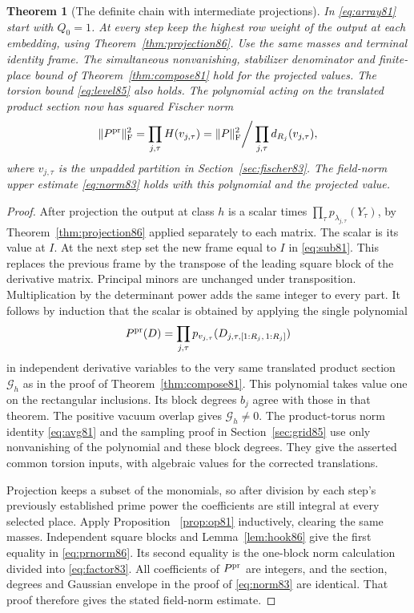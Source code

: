 \documentclass[a4paper,11pt]{article}
\newtheorem{theorem}[proposition]{Theorem}
\theoremstyle{definition}
\theoremstyle{remark}
\numberwithin{equation}{section}
\begin{document}
\begin{theorem}[The definite chain with intermediate projections]
\label{thm:projectchain86}
In \eqref{eq:array81} start with \(Q_0=1\). At every step keep
the highest row weight of the output at each embedding, using
Theorem~\ref{thm:projection86}. Use the same masses and terminal
identity frame. The simultaneous nonvanishing, stabilizer denominator
and finite-place bound of Theorem~\ref{thm:compose81} hold for the
projected values. The torsion bound \eqref{eq:level85} also holds.
The polynomial acting on the translated product section now has
squared Fischer norm
\begin{equation}
 \|P^{\rm pr}\|_{\rm F}^2=\prod_{j,\tau}H(v_{j,\tau})
   =\|P\|_{\rm F}^2\bigg/\prod_{j,\tau}d_{R_j}(v_{j,\tau}),
                                                        \label{eq:prnorm86}
\end{equation}
where \(v_{j,\tau}\) is the unpadded partition in
Section~\ref{sec:fischer83}. The field-norm upper estimate
\eqref{eq:norm83} holds with this polynomial and the projected value.
\end{theorem}
\begin{proof}
After projection the output at class \(h\) is a scalar times
\(\prod_\tau p_{\lambda_{j,\tau}}(Y_\tau)\), by
Theorem~\ref{thm:projection86} applied separately to each
matrix. The scalar is its value at \(I\). At the next step set
the new frame equal to \(I\) in \eqref{eq:sub81}. This replaces
the previous frame by the transpose of the leading square block
of the derivative matrix. Principal minors are unchanged under
transposition. Multiplication by the determinant power adds the
same integer to every part. It follows by induction that the
scalar is obtained by applying the single polynomial
\[
       P^{\rm pr}(D)=\prod_{j,\tau}
          p_{v_{j,\tau}}(D_{j,\tau,[1:R_j,\,1:R_j]})
\]
in independent derivative variables to the very same translated
product section \(\mathcal G_h\) as in the proof of
Theorem~\ref{thm:compose81}. This polynomial takes value one on
the rectangular inclusions. Its block degrees \(b_j\) agree with
those in that theorem. The positive vacuum overlap gives
\(\mathcal G_h\ne0\). The product-torus norm identity
\eqref{eq:avg81} and the sampling proof in Section~\ref{sec:grid85}
use only nonvanishing of the polynomial and these block degrees.
They give the asserted common torsion inputs, with algebraic
values for the corrected translations.

Projection keeps a subset of the monomials, so after division by
each step's previously established prime power the coefficients
are still integral at every selected place. Apply Proposition
~\ref{prop:op81} inductively, clearing the same masses.
Independent square blocks and Lemma~\ref{lem:hook86} give the
first equality in \eqref{eq:prnorm86}. Its second equality is
the one-block norm calculation divided into \eqref{eq:factor83}.
All coefficients of \(P^{\rm pr}\) are integers, and the section,
degrees and Gaussian envelope in the proof of \eqref{eq:norm83}
are identical. That proof therefore gives the stated field-norm
estimate.
\end{proof}
\end{document}

